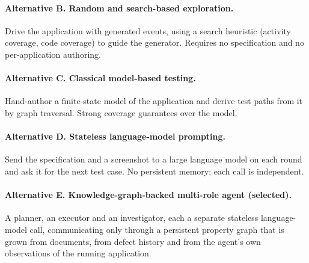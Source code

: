 \paragraph{Alternative B. Random and search-based exploration.} Drive the
application with generated events, using a search heuristic (activity coverage,
code coverage) to guide the generator. Requires no specification and no
per-application authoring.

\paragraph{Alternative C. Classical model-based testing.} Hand-author a
finite-state model of the application and derive test paths from it by graph
traversal. Strong coverage guarantees over the model.

\paragraph{Alternative D. Stateless language-model prompting.} Send the
specification and a screenshot to a large language model on each round and ask
it for the next test case. No persistent memory; each call is independent.

\paragraph{Alternative E. Knowledge-graph-backed multi-role agent
(selected).} A planner, an executor and an investigator, each a separate
stateless language-model call, communicating only through a persistent property
graph that is grown from documents, from defect history and from the agent's
own observations of the running application.

